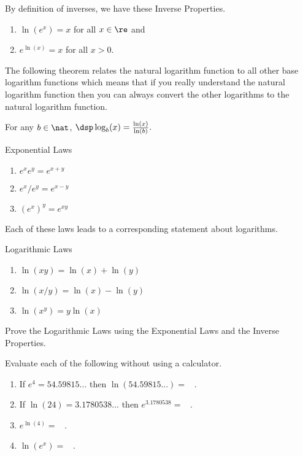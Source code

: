 By definition of inverses, we have these Inverse Properties.
\begin{enumerate}
\item $\ln(e^x) = x$ for all $x \in \re$ and
\item $e^{\ln(x)}=x$ for all $x > 0.$
\end{enumerate}

The following theorem relates the natural logarithm function to all other base logarithm functions which means that if you really understand the natural logarithm function then you can always convert the other logarithms to the natural logarithm function.

\begin{thm}
For any $b \in {\nat}$,  $\dsp \log_b(x) = \frac{\ln(x)}{\ln(b)}.$
\end{thm}

\begin{thm} Exponential Laws
\begin{enumerate}
\item $e^xe^y = e^{x+y}$
\item $e^x/e^y = e^{x-y}$
\item $(e^x)^y = e^{xy}$
\end{enumerate}
\end{thm}

Each of these laws leads to a corresponding statement about logarithms.

\begin{thm} Logarithmic Laws
\begin{enumerate}
\item $\ln(xy) = \ln(x) + \ln(y)$
\item $\ln(x/y) = \ln(x) - \ln(y)$
\item $\ln(x^y) = y\ln(x)$
\end{enumerate}
\end{thm}

\begin{prb}
Prove the Logarithmic Laws using the Exponential Laws and the Inverse Properties.
\end{prb}

\begin{prb} \label{e1}
Evaluate each of the following without using a calculator.

    \begin{enumerate}
    \item If $e^4 = 54.59815 . . .$  then   $\ln(54.59815 . . .) = $ \hrulefill\ .
    \item If $\ln(24) = 3 .1780538 . . .$   then  $e^{3 .1780538}  =$ \hrulefill\ .
    \item $e^{\ln(4)} = $ \hrulefill\ .
    \item $\ln(e^{x}) = $ \hrulefill\ .
    \end{enumerate}
\end{prb}

